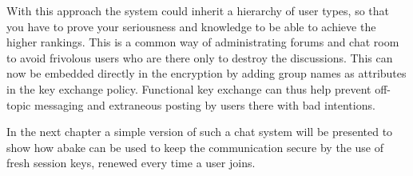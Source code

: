\par  With this approach the system could inherit a hierarchy of user types, so that you have to prove your seriousness and knowledge to be able to achieve the higher rankings. This is a common way of administrating forums and chat room to avoid frivolous users who are there only to destroy the discussions. This can now be embedded directly in the encryption by adding group names as attributes in the key exchange policy. Functional key exchange can thus help prevent off-topic messaging and extraneous posting by users there with bad intentions.

\par In the next chapter a simple version of such a chat system will be presented to show how \gls{abake} can be used to keep the communication secure by the use of fresh session keys, renewed every time a user joins. 
